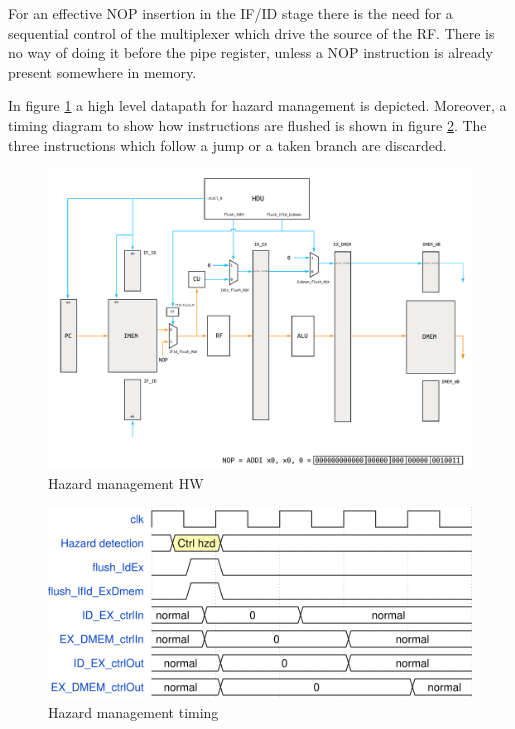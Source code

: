 \documentclass[a4paper]{article}
\begin{document}
For an effective NOP insertion in the IF/ID stage there is the need for a sequential control of the multiplexer which drive the source of the RF. There is no way of doing it before the pipe register, unless a NOP instruction is already present somewhere in memory.

In figure \ref{fig:hzd_management} a high level datapath for hazard management is depicted. Moreover, a timing diagram to show how instructions are flushed is shown in figure \ref{fig:hzd_management_timing}. The three instructions which follow a jump or a taken branch are discarded. 

\begin{figure}[hbtp]
    \centering
    \includegraphics[scale=0.5]{../hzd_management/ref/schematic/hzd_management.pdf}
    \caption{Hazard management HW}
    \label{fig:hzd_management}
\end{figure}

\begin{figure}[hbtp]
    \centering
    \includegraphics[scale=0.8]{../hzd_management/ref/timing/hzd_management_timing.png}
    \caption{Hazard management timing}
    \label{fig:hzd_management_timing}
\end{figure}
\end{document}
